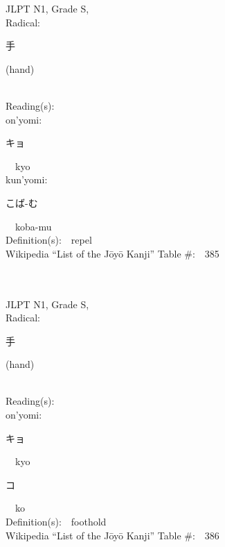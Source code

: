 \begin{multicols}{2}
{JLPT N1, Grade S, \\Radical:\ \ {\begin{CJK}{UTF8}{min} 手 \end{CJK}} (hand) } \\
Reading(s):\ \ \\
{\hspace*{1em}}on'yomi:\ \ \\
{\hspace*{2em}}{\begin{CJK}{UTF8}{min} キョ \end{CJK}}\ \ kyo\ \ \\
{\hspace*{1em}}kun'yomi:\ \ \\
{\hspace*{2em}}{\begin{CJK}{UTF8}{min} こば-む \end{CJK}}\ \ koba-mu\ \ \\
Definition(s):\ \ repel \\
Wikipedia ``List of the J\=oy\=o Kanji'' Table \#:\ \ 385 \\
\ \ \\
{\fontsize{34pt}{40pt}  }\ \ \\
{JLPT N1, Grade S, \\Radical:\ \ {\begin{CJK}{UTF8}{min} 手 \end{CJK}} (hand) } \\
Reading(s):\ \ \\
{\hspace*{1em}}on'yomi:\ \ \\
{\hspace*{2em}}{\begin{CJK}{UTF8}{min} キョ \end{CJK}}\ \ kyo\ \ \\
{\hspace*{2em}}{\begin{CJK}{UTF8}{min} コ \end{CJK}}\ \ ko\ \ \\
Definition(s):\ \ foothold \\
Wikipedia ``List of the J\=oy\=o Kanji'' Table \#:\ \ 386 \\
\ \ \\
{\fontsize{34pt}{40pt}  }\ \ \\

\end{multicols}
